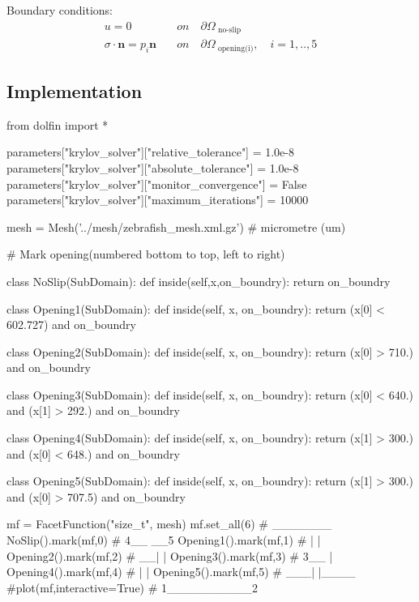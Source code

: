 \documentclass[epsfig,11pt]{article}
\begin{document}
Boundary conditions:
\begin{align*}
u = 0 \quad &on \quad \partial \Omega_{\text{ no-slip}} \\
\sigma \cdot \mathbf{n} = p_i\mathbf{n} \quad &on \quad \partial \Omega_\text{ opening(i)},\quad i=1,..,5
\end{align*}

\subsection{Implementation}

\begin{python}
from dolfin import *

parameters["krylov_solver"]["relative_tolerance"] = 1.0e-8 
parameters["krylov_solver"]["absolute_tolerance"] = 1.0e-8 
parameters["krylov_solver"]["monitor_convergence"] = False 
parameters["krylov_solver"]["maximum_iterations"] = 10000

mesh = Mesh('../mesh/zebrafish_mesh.xml.gz')    # micrometre (um)

# Mark opening(numbered bottom to top, left to right)

class NoSlip(SubDomain):
    def inside(self,x,on_boundry):
        return on_boundry

class Opening1(SubDomain):              
    def inside(self, x, on_boundry):
        return (x[0] < 602.727) and on_boundry

class Opening2(SubDomain):                 
    def inside(self, x, on_boundry):
        return (x[0] > 710.) and on_boundry

class Opening3(SubDomain):                 
    def inside(self, x, on_boundry):
        return (x[0] < 640.) and (x[1] > 292.) and on_boundry

class Opening4(SubDomain):
    def inside(self, x, on_boundry):
        return (x[1] > 300.) and (x[0] < 648.) and on_boundry

class Opening5(SubDomain):
    def inside(self, x, on_boundry):
        return (x[1] > 300.) and (x[0] > 707.5) and on_boundry

mf = FacetFunction("size_t", mesh)
mf.set_all(6)              #      _______
NoSlip().mark(mf,0)        #     4__   __5
Opening1().mark(mf,1)      #        | | 
Opening2().mark(mf,2)      #      __| |
Opening3().mark(mf,3)      #     3__  | 
Opening4().mark(mf,4)      #        | |
Opening5().mark(mf,5)      #     ___| |____ 
#plot(mf,interactive=True) #    1__________2
                             

\end{python}
\end{document}
